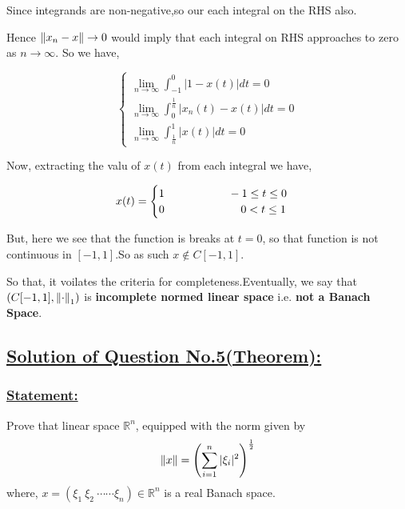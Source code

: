 \documentclass[a4paper,12pt]{article}
\begin{document}
    Since integrands are non-negative,so our each integral on the RHS also.

    Hence $\norm{x_n - x}\to 0$  would imply that each integral on RHS approaches to zero as $n\to \infty$. So we have,

    \begin{equation*}
        \begin{cases}
           \displaystyle \lim_{n\to \infty} \int_{-1}^{0}|1-x(t)|dt = 0\\[1cm]
           \displaystyle \lim_{n\to \infty} \int_{0}^{\frac{1}{n}}|x_n(t)-x(t)|dt = 0\\[1cm]
           \displaystyle \lim_{n\to \infty}  \int_{\frac{1}{n}}^{1}|x(t)|dt = 0
        \end{cases}
    \end{equation*}

    Now, extracting the valu of $x(t)$ from each integral we have,

    \begin{equation*}
        x(t) = \begin{cases}
            1 \hspace*{2cm} -1\leq t \leq 0\\
            0 \hspace*{2.4cm} 0 < t \leq 1
        \end{cases}
    \end{equation*}

    But, here we see that the function is breaks at $t = 0$, so that function is not continuous in $[-1,1]$.So as such $x\not \in C[-1,1]$.

    \vspace*{0.6cm}

    So that, it voilates the criteria for completeness.Eventually, we say that $\left(C[-1,1],\norm{\cdot}_1\right)$ is {\bf incomplete normed linear space} i.e. {\bf not a Banach Space}. 

    \pagebreak

    \subsection*{\underline{Solution of Question No.5(Theorem):}}

    \subsubsection*{\underline{{\bf Statement:}}}

    Prove that linear space $\mathbb{R}^n$, equipped with the norm given by 
    \[\norm{x} = \left(\sum_{i=1}^{n}|\xi_i|^2\right)^{\frac{1}{2}}\] where, $x = \left(\xi_1\ \xi_2\ \cdots \cdots\xi_n\right)\in \mathbb{R}^n$ is a real Banach space.
\end{document}
